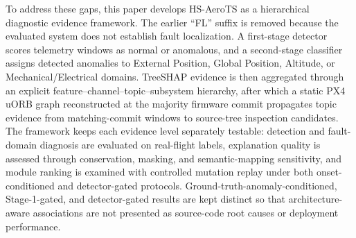 To address these gaps, this paper develops HS-AeroTS as a hierarchical diagnostic evidence framework. The earlier ``FL'' suffix is removed because the evaluated system does not establish fault localization. A first-stage detector scores telemetry windows as normal or anomalous, and a second-stage classifier assigns detected anomalies to External Position, Global Position, Altitude, or Mechanical/Electrical domains. TreeSHAP evidence is then aggregated through an explicit feature--channel--topic--subsystem hierarchy, after which a static PX4 uORB graph reconstructed at the majority firmware commit propagates topic evidence from matching-commit windows to source-tree inspection candidates. The framework keeps each evidence level separately testable: detection and fault-domain diagnosis are evaluated on real-flight labels, explanation quality is assessed through conservation, masking, and semantic-mapping sensitivity, and module ranking is examined with controlled mutation replay under both onset-conditioned and detector-gated protocols. Ground-truth-anomaly-conditioned, Stage-1-gated, and detector-gated results are kept distinct so that architecture-aware associations are not presented as source-code root causes or deployment performance.
